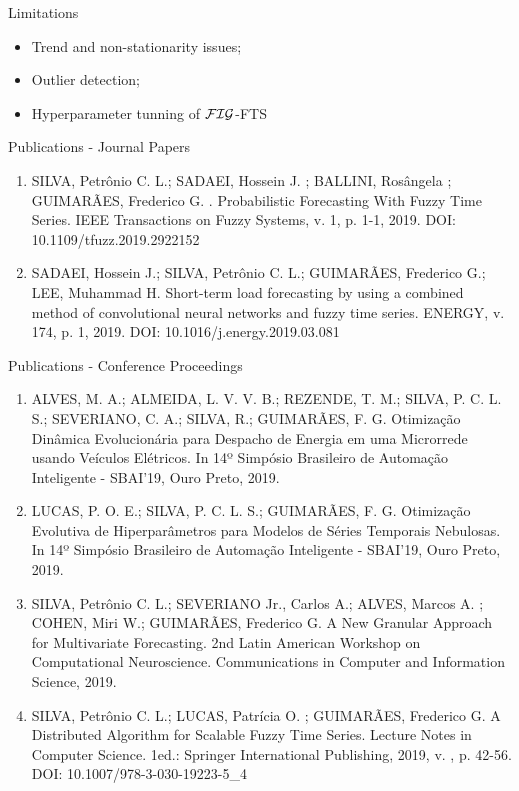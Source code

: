 \documentclass{beamer}
\begin{document}
\begin{frame}{Limitations}
\linespread{2}
\begin{itemize}
    \item Trend and non-stationarity issues;
    \item Outlier detection;
    \item Hyperparameter tunning of $\mathcal{FIG}$-FTS
\end{itemize}
\end{frame}


\begin{frame}{Publications - Journal Papers}
\begin{enumerate}
    \item SILVA, Petrônio C. L.; SADAEI, Hossein J. ; BALLINI, Rosângela ; GUIMARÃES, Frederico G. . Probabilistic Forecasting With Fuzzy Time Series. IEEE Transactions on Fuzzy Systems, v. 1, p. 1-1, 2019. DOI: 10.1109/tfuzz.2019.2922152
    \item SADAEI, Hossein J.; SILVA, Petrônio C. L.; GUIMARÃES, Frederico G.; LEE, Muhammad H. Short-term load forecasting by using a combined method of convolutional neural networks and fuzzy time series. ENERGY, v. 174, p. 1, 2019. DOI: 10.1016/j.energy.2019.03.081
\end{enumerate}
\end{frame}

\begin{frame}{Publications - Conference Proceedings}
\scriptsize
\begin{enumerate}
\item  ALVES, M. A.; ALMEIDA, L. V. V. B.; REZENDE, T. M.; SILVA, P. C. L. S.; SEVERIANO, C. A.; SILVA, R.; GUIMARÃES, F. G. Otimização Dinâmica Evolucionária para Despacho de Energia em uma Microrrede usando Veículos Elétricos. In 14º Simpósio Brasileiro de Automação Inteligente - SBAI'19, Ouro Preto, 2019.
\item  LUCAS, P. O. E.; SILVA, P. C. L. S.; GUIMARÃES, F. G. Otimização Evolutiva de Hiperparâmetros para Modelos de Séries Temporais Nebulosas.  In 14º Simpósio Brasileiro de Automação Inteligente - SBAI'19, Ouro Preto, 2019.
\item SILVA, Petrônio C. L.; SEVERIANO Jr., Carlos A.; ALVES, Marcos A. ; COHEN, Miri W.; GUIMARÃES, Frederico G. A New Granular Approach for Multivariate Forecasting. 2nd Latin American Workshop on Computational Neuroscience. Communications in Computer and Information Science, 2019.
\item SILVA, Petrônio C. L.; LUCAS, Patrícia O. ; GUIMARÃES, Frederico G. A Distributed Algorithm for Scalable Fuzzy Time Series. Lecture Notes in Computer Science. 1ed.: Springer International Publishing, 2019, v. , p. 42-56. DOI: 10.1007/978-3-030-19223-5\_4
\end{enumerate}
\end{frame}
\end{document}
